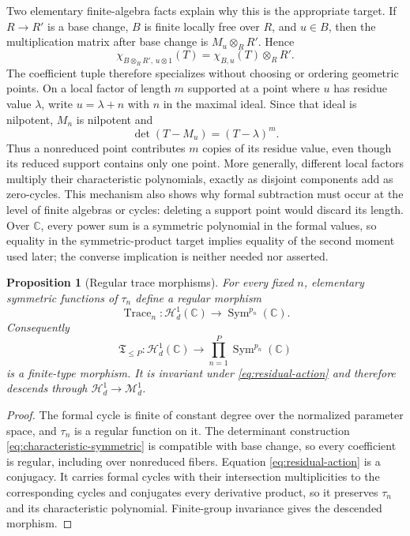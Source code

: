 \documentclass[11pt]{article}
\newtheorem{proposition}[theorem]{Proposition}
\theoremstyle{definition}
\newcommand{\C}{\mathbb C}
\newcommand{\Hn}{\mathcal H}
\newcommand{\Mn}{\mathcal M}
\newcommand{\Trace}{\operatorname{Trace}}
\newcommand{\Sym}{\operatorname{Sym}}
\begin{document}
Two elementary finite-algebra facts explain why this is the appropriate target. If $R\to R'$ is a base change, $B$ is finite locally free over $R$, and $u\in B$, then the multiplication matrix after base change is $M_u\otimes_RR'$. Hence
\[
\chi_{B\otimes_RR',\,u\otimes1}(T)
=\chi_{B,u}(T)\otimes_RR'.
\]
The coefficient tuple therefore specializes without choosing or ordering geometric points. On a local factor of length $m$ supported at a point where $u$ has residue value $\lambda$, write $u=\lambda+n$ with $n$ in the maximal ideal. Since that ideal is nilpotent, $M_n$ is nilpotent and
\[
\det(T-M_u)=(T-\lambda)^m.
\]
Thus a nonreduced point contributes $m$ copies of its residue value, even though its reduced support contains only one point. More generally, different local factors multiply their characteristic polynomials, exactly as disjoint components add as zero-cycles. This mechanism also shows why formal subtraction must occur at the level of finite algebras or cycles: deleting a support point would discard its length. Over $\C$, every power sum is a symmetric polynomial in the formal values, so equality in the symmetric-product target implies equality of the second moment used later; the converse implication is neither needed nor asserted.

\begin{proposition}[Regular trace morphisms]
\label{prop:regular-trace}
For every fixed $n$, elementary symmetric functions of $\tau_n$ define a regular morphism
\[
\Trace_n:\Hn^1_d(\C)\longrightarrow\Sym^{p_n}(\C).
\]
Consequently
\[
\mathfrak T_{\le P}:\Hn^1_d(\C)
\longrightarrow\prod_{n=1}^P\Sym^{p_n}(\C)
\]
is a finite-type morphism. It is invariant under \eqref{eq:residual-action} and therefore descends through $\Hn^1_d\to\Mn^1_d$.
\end{proposition}

\begin{proof}
The formal cycle is finite of constant degree over the normalized parameter space, and $\tau_n$ is a regular function on it. The determinant construction \eqref{eq:characteristic-symmetric} is compatible with base change, so every coefficient is regular, including over nonreduced fibers. Equation \eqref{eq:residual-action} is a conjugacy. It carries formal cycles with their intersection multiplicities to the corresponding cycles and conjugates every derivative product, so it preserves $\tau_n$ and its characteristic polynomial. Finite-group invariance gives the descended morphism.
\end{proof}
\end{document}
